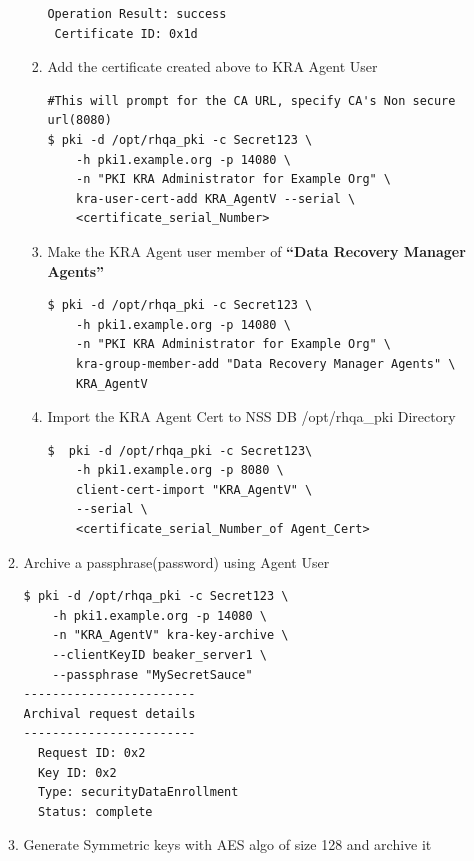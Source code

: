 \documentclass[12pt]{report}
\begin{document}
\begin{enumerate}[label*=\arabic*.]
\begin{enumerate}[label*=\arabic*.]
\begin{enumerate}[label*=\arabic*.]
\begin{lstlisting}[style=bashInputStyle]
 Operation Result: success
 Certificate ID: 0x1d
                            \end{lstlisting}
                        \item Add the certificate created above to KRA Agent User
                            \begin{lstlisting}[style=bashInputStyle]
#This will prompt for the CA URL, specify CA's Non secure url(8080)                            
$ pki -d /opt/rhqa_pki -c Secret123 \
    -h pki1.example.org -p 14080 \
    -n "PKI KRA Administrator for Example Org" \
    kra-user-cert-add KRA_AgentV --serial \
    <certificate_serial_Number>
                            \end{lstlisting}
                        \item Make the KRA Agent user member of \textbf{``Data Recovery Manager Agents''}
                            \begin{lstlisting}[style=bashInputStyle]
$ pki -d /opt/rhqa_pki -c Secret123 \
    -h pki1.example.org -p 14080 \
    -n "PKI KRA Administrator for Example Org" \
    kra-group-member-add "Data Recovery Manager Agents" \
    KRA_AgentV
                            \end{lstlisting}
                        \item Import the KRA Agent Cert to NSS DB /opt/rhqa\_pki Directory
                            \begin{lstlisting}[style=bashInputStyle]
$  pki -d /opt/rhqa_pki -c Secret123\
    -h pki1.example.org -p 8080 \
    client-cert-import "KRA_AgentV" \
    --serial \
    <certificate_serial_Number_of Agent_Cert>
                            \end{lstlisting}
                    \end{enumerate}
                \item \label{arch_password}  Archive a passphrase(password) using Agent User
                    \begin{lstlisting}[style=bashInputStyle]
$ pki -d /opt/rhqa_pki -c Secret123 \
    -h pki1.example.org -p 14080 \
    -n "KRA_AgentV" kra-key-archive \
    --clientKeyID beaker_server1 \
    --passphrase "MySecretSauce"
------------------------
Archival request details
------------------------
  Request ID: 0x2
  Key ID: 0x2
  Type: securityDataEnrollment
  Status: complete
                    \end{lstlisting}
                \item \label{arch_symmetric} Generate Symmetric keys with AES algo of size 128 and archive it

\end{enumerate}
\end{enumerate}
\end{document}
